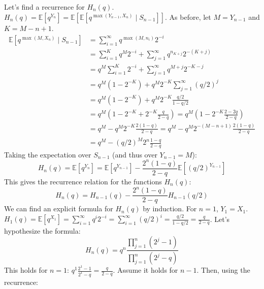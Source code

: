 \documentclass[12pt,a4paper]{article}
\theoremstyle{definition}
\begin{document}
    Let's find a recurrence for $H_n(q)$.
    $H_n(q) = \mathbb{E}[q^{Y_n}] = \mathbb{E}[\mathbb{E}[q^{\max(Y_{n-1}, X_n)}\mid S_{n-1}]]$.
    As before, let $M=Y_{n-1}$ and $K=M-n+1$.
    \begin{align}
        \mathbb{E}[q^{\max(M, X_n)}\mid S_{n-1}] &= \sum_{i=1}^{\infty} q^{\max(M, n_i)} 2^{-i} \\
        &= \sum_{i=1}^{K} q^M 2^{-i} + \sum_{j=1}^{\infty} q^{n_{K+j}} 2^{-(K+j)} \\
        &= q^M \sum_{i=1}^{K} 2^{-i} + \sum_{j=1}^{\infty} q^{M+j} 2^{-K-j} \\
        &= q^M(1-2^{-K}) + q^M 2^{-K} \sum_{j=1}^{\infty} (q/2)^j \\
        &= q^M(1-2^{-K}) + q^M 2^{-K} \frac{q/2}{1-q/2} \\
        &= q^M\left(1-2^{-K} + 2^{-K}\frac{q}{2-q}\right) = q^M\left(1 - 2^{-K}\frac{2-2q}{2-q}\right) \\
        &= q^M - q^M 2^{-K} \frac{2(1-q)}{2-q} = q^M - q^M 2^{-(M-n+1)} \frac{2(1-q)}{2-q} \\
        &= q^M - (q/2)^M 2^n \frac{1-q}{2-q}
    \end{align}
    Taking the expectation over $S_{n-1}$ (and thus over $Y_{n-1}=M$):
    \[ H_n(q) = \mathbb{E}[q^{Y_n}] = \mathbb{E}[q^{Y_{n-1}}] - \frac{2^n(1-q)}{2-q} \mathbb{E}[(q/2)^{Y_{n-1}}] \]
    This gives the recurrence relation for the functions $H_n(q)$:
    \[ H_n(q) = H_{n-1}(q) - \frac{2^n(1-q)}{2-q} H_{n-1}(q/2) \]
    We can find an explicit formula for $H_n(q)$ by induction.
    For $n=1$, $Y_1=X_1$. $H_1(q) = \mathbb{E}[q^{X_1}] = \sum_{i=1}^\infty q^i 2^{-i} = \sum_{i=1}^\infty (q/2)^i = \frac{q/2}{1-q/2} = \frac{q}{2-q}$.
    Let's hypothesize the formula:
    \[ H_n(q) = q^n \frac{\prod_{j=1}^n(2^j-1)}{\prod_{j=1}^n(2^j-q)} \]
    This holds for $n=1$: $q^1 \frac{2^1-1}{2^1-q} = \frac{q}{2-q}$.
    Assume it holds for $n-1$. Then, using the recurrence:
\end{document}

